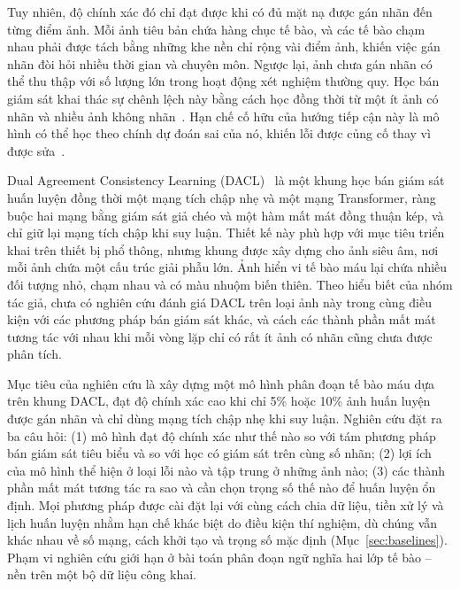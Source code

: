 \documentclass{IEEEtran}
\begin{document}
Tuy nhiên, độ chính xác đó chỉ đạt được khi có đủ mặt nạ được gán nhãn đến từng điểm ảnh. Mỗi ảnh tiêu bản chứa hàng chục tế bào, và các tế bào chạm nhau phải được tách bằng những khe nền chỉ rộng vài điểm ảnh, khiến việc gán nhãn đòi hỏi nhiều thời gian và chuyên môn. Ngược lại, ảnh chưa gán nhãn có thể thu thập với số lượng lớn trong hoạt động xét nghiệm thường quy. Học bán giám sát khai thác sự chênh lệch này bằng cách học đồng thời từ một ít ảnh có nhãn và nhiều ảnh không nhãn~\cite{survey}. Hạn chế cố hữu của hướng tiếp cận này là mô hình có thể học theo chính dự đoán sai của nó, khiến lỗi được củng cố thay vì được sửa~\cite{confirm}.

Dual Agreement Consistency Learning (DACL)~\cite{dacl} là một khung học bán giám sát huấn luyện đồng thời một mạng tích chập nhẹ và một mạng Transformer, ràng buộc hai mạng bằng giám sát giả chéo và một hàm mất mát đồng thuận kép, và chỉ giữ lại mạng tích chập khi suy luận. Thiết kế này phù hợp với mục tiêu triển khai trên thiết bị phổ thông, nhưng khung được xây dựng cho ảnh siêu âm, nơi mỗi ảnh chứa một cấu trúc giải phẫu lớn. Ảnh hiển vi tế bào máu lại chứa nhiều đối tượng nhỏ, chạm nhau và có màu nhuộm biến thiên. Theo hiểu biết của nhóm tác giả, chưa có nghiên cứu đánh giá DACL trên loại ảnh này trong cùng điều kiện với các phương pháp bán giám sát khác, và cách các thành phần mất mát tương tác với nhau khi mỗi vòng lặp chỉ có rất ít ảnh có nhãn cũng chưa được phân tích.

Mục tiêu của nghiên cứu là xây dựng một mô hình phân đoạn tế bào máu dựa trên khung DACL, đạt độ chính xác cao khi chỉ 5\% hoặc 10\% ảnh huấn luyện được gán nhãn và chỉ dùng mạng tích chập nhẹ khi suy luận. Nghiên cứu đặt ra ba câu hỏi: (1) mô hình đạt độ chính xác như thế nào so với tám phương pháp bán giám sát tiêu biểu và so với học có giám sát trên cùng số nhãn; (2) lợi ích của mô hình thể hiện ở loại lỗi nào và tập trung ở những ảnh nào; (3) các thành phần mất mát tương tác ra sao và cần chọn trọng số thế nào để huấn luyện ổn định. Mọi phương pháp được cài đặt lại với cùng cách chia dữ liệu, tiền xử lý và lịch huấn luyện nhằm hạn chế khác biệt do điều kiện thí nghiệm, dù chúng vẫn khác nhau về số mạng, cách khởi tạo và trọng số mặc định (Mục~\ref{sec:baselines}). Phạm vi nghiên cứu giới hạn ở bài toán phân đoạn ngữ nghĩa hai lớp tế bào -- nền trên một bộ dữ liệu công khai.
\end{document}
